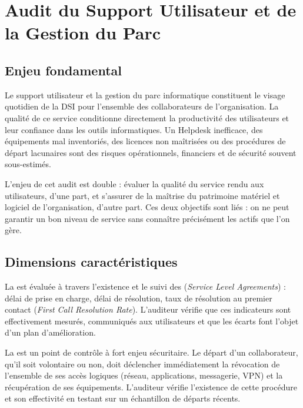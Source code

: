 \section{Audit du Support Utilisateur et de la Gestion du Parc}

\subsection{Enjeu fondamental}

Le support utilisateur et la gestion du parc informatique constituent le visage quotidien de la DSI pour l'ensemble des collaborateurs de l'organisation. La qualité de ce service conditionne directement la productivité des utilisateurs et leur confiance dans les outils informatiques. Un Helpdesk inefficace, des équipements mal inventoriés, des licences non maîtrisées ou des procédures de départ lacunaires sont des risques opérationnels, financiers et de sécurité souvent sous-estimés.

L'enjeu de cet audit est double : évaluer la qualité du service rendu aux utilisateurs, d'une part, et s'assurer de la maîtrise du patrimoine matériel et logiciel de l'organisation, d'autre part. Ces deux objectifs sont liés : on ne peut garantir un bon niveau de service sans connaître précisément les actifs que l'on gère.

\subsection{Dimensions caractéristiques}

La  est évaluée à travers l'existence et le suivi des  (\textit{Service Level Agreements}) : délai de prise en charge, délai de résolution, taux de résolution au premier contact (\textit{First Call Resolution Rate}). L'auditeur vérifie que ces indicateurs sont effectivement mesurés, communiqués aux utilisateurs et que les écarts font l'objet d'un plan d'amélioration.

La  est un point de contrôle à fort enjeu sécuritaire. Le départ d'un collaborateur, qu'il soit volontaire ou non, doit déclencher immédiatement la révocation de l'ensemble de ses accès logiques (réseau, applications, messagerie, VPN) et la récupération de ses équipements. L'auditeur vérifie l'existence de cette procédure et son effectivité en testant sur un échantillon de départs récents.

